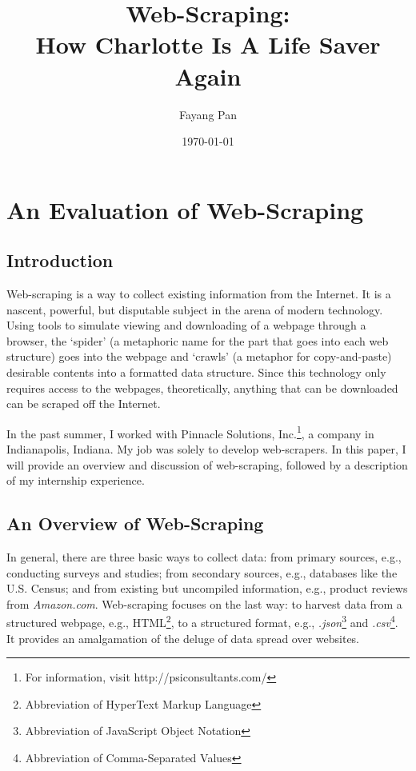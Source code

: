 \documentclass[12pt]{report}
\begin{document}
\lstset{language=Python,
basicstyle=\ttfamily,
commentstyle=\textit,
breaklines=true,
numbersep=5pt,
xleftmargin=.25in,
xrightmargin=.25in,
columns=fullflexible,
showstringspaces=false}
\title{Web-Scraping:\\ How Charlotte Is A Life Saver Again}
\author{Fayang Pan}
\date{\today}
\maketitle
\tableofcontents
\listoffigures


\chapter{An Evaluation of Web-Scraping}
\section*{Introduction}

\indent Web-scraping is a way to collect existing information from the Internet. It is a nascent, powerful, but disputable subject in the arena of modern technology. Using tools to simulate viewing and downloading of a webpage through a browser, the `spider' (a metaphoric name for the part that goes into each web structure) goes into the webpage and `crawls' (a metaphor for copy-and-paste) desirable contents into a formatted data structure. Since this technology only requires access to the webpages, theoretically, anything that can be downloaded can be scraped off the Internet.

In the past summer, I worked with Pinnacle Solutions, Inc.\footnote{For information, visit http://psiconsultants.com/}, a company in Indianapolis, Indiana. My job was solely to develop web-scrapers. In this paper, I will provide an overview and discussion of web-scraping, followed by a description of my internship experience.

\section{An Overview of Web-Scraping}
In general, there are three basic ways to collect data: from primary sources, e.g., conducting surveys and studies; from secondary sources, e.g., databases like the U.S. Census; and from existing but uncompiled information, e.g., product reviews from \textit{Amazon.com}. Web-scraping focuses on the last way: to harvest data from a structured webpage, e.g., HTML\footnote{Abbreviation of HyperText Markup Language}, to a structured format, e.g.,  \textit{.json}\footnote{Abbreviation of JavaScript Object Notation} and \textit{.csv}\footnote{Abbreviation of Comma-Separated Values}. It provides an amalgamation of the deluge of data spread over websites.
\end{document}
